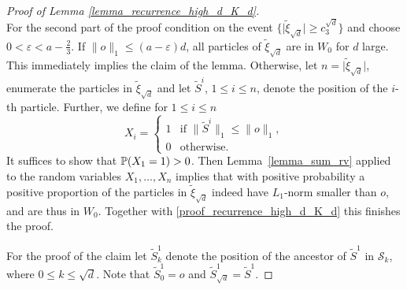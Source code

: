 \begin{proof}[Proof of Lemma \ref{lemma_recurrence_high_d_K_d}]
\begin{equation}
\end{equation}
For the second part of the proof condition on the event $\bigr\{\lvert\tilde{\xi}_{\sqrt{d}}\rvert \geq c_3^{\sqrt{d}}\bigl\}$ and choose $0 < \varepsilon <a-\frac23$. If $\lVert o \rVert_1 \leq (a-\varepsilon)d$, all particles of $\tilde{\xi}_{\sqrt{d}}$ are in $W_0$ for $d$ large. This immediately implies the claim of the lemma. Otherwise, let $n=\lvert\tilde{\xi}_{\sqrt{d}}\rvert$, enumerate the particles in $\tilde{\xi}_{\sqrt{d}}$ and let $\tilde{S}^i$, $1 \leq i \leq n$, denote the position of the $i$-th particle. Further, we define for $1 \leq i \leq n$
\begin{equation*}
 X_i =
 \begin{cases}
  1 & \text{if $\lVert \tilde{S}^i \rVert_1 \leq \lVert o \rVert_1 $}, \\
  0 & \text{otherwise.}
 \end{cases}
\end{equation*}
It suffices to show that $\P(X_1=1)>0$. Then Lemma~\ref{lemma_sum_rv} applied to the random variables $X_1, \ldots, X_n$ implies that with positive probability a positive proportion of the particles in $\tilde{\xi}_{\sqrt{d}}$ indeed have $L_1$-norm smaller than $o$, and are thus in $W_0$. Together with \eqref{proof_recurrence_high_d_K_d} this finishes the proof.

For the proof of the claim let $\tilde{S}^1_k$ denote the position of the ancestor of $\tilde{S}^1$ in $\mathcal{S}_k$, where $0 \leq k \leq \sqrt{d}$. Note that $\tilde{S}^1_0 = o$ and $\tilde{S}^1_{\sqrt{d}} = \tilde{S}^1$.


\end{proof}
